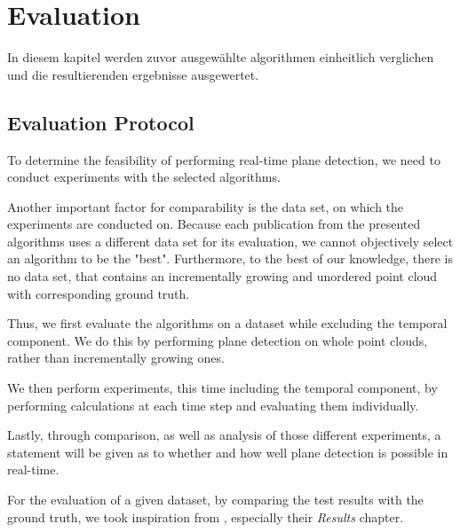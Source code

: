 \documentclass[main.tex]{subfiles}
\begin{document}
\chapter{Evaluation}

In diesem kapitel werden zuvor ausgewählte algorithmen einheitlich verglichen und die resultierenden ergebnisse ausgewertet.

\section{Evaluation Protocol}

To determine the feasibility of performing real-time plane detection, we need to conduct experiments with the selected algorithms.

Another important factor for comparability is the data set, on which the experiments are conducted on.
Because each publication from the presented algorithms uses a different data set for its evaluation, we cannot objectively select an algorithm to be the "best".
Furthermore, to the best of our knowledge, there is no data set, that contains an incrementally growing and unordered point cloud with corresponding ground truth.

Thus, we first evaluate the algorithms on a dataset while excluding the temporal component. We do this by performing plane detection on whole point clouds, rather than
incrementally growing ones. 

We then perform experiments, this time including the temporal component, by performing calculations at each time step and evaluating them individually.

Lastly, through comparison, as well as analysis of those different experiments, a statement will be given as to whether and how well plane detection is
possible in real-time.

For the evaluation of a given dataset, by comparing the test results with the ground truth, we took inspiration from \citeauthor{Araújo_Oliveira_2020} ,
especially their \textit{Results} chapter.
\end{document}
